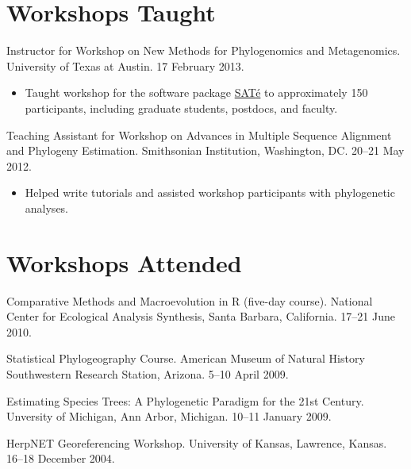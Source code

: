 \documentclass[10pt]{article}
\newcommand{\myHangIndent}{\hangindent=5mm}
\newcommand{\myIndent}{\hspace{5mm}}
\begin{document}
\section*{Workshops Taught}
\myHangIndent
Instructor for Workshop on New Methods for Phylogenomics and Metagenomics.
University of Texas at Austin.
17 February 2013. \\
\begin{itemize}
    \setlength{\leftskip}{0em}
    \setlength{\itemsep}{0.25em}
    \setlength{\parskip}{-1em}
    \setlength{\parsep}{0.5em}
\item Taught workshop for the software package
    \href{http://phylo.bio.ku.edu/software/sate/sate.html}{{SAT}\'{e}} to
approximately 150 participants, including graduate students, postdocs, and
faculty.
\end{itemize}

\myHangIndent
Teaching Assistant for Workshop on Advances in Multiple Sequence Alignment and
Phylogeny Estimation.
Smithsonian Institution, Washington, DC.
20--21 May 2012. \\
\begin{itemize}
    \setlength{\leftskip}{0em}
    \setlength{\itemsep}{0.25em}
    \setlength{\parskip}{-1em}
    \setlength{\parsep}{0.5em}
    \item Helped write tutorials and assisted workshop participants with
        phylogenetic analyses.
\end{itemize}

\section*{Workshops Attended}
\myHangIndent
Comparative Methods and Macroevolution in R (five-day course).
National Center for Ecological Analysis Synthesis, Santa Barbara, California.
17--21 June 2010.

\myHangIndent
Statistical Phylogeography Course.
American Museum of Natural History Southwestern Research Station, Arizona.
5--10 April 2009.

\myHangIndent
Estimating Species Trees: A Phylogenetic Paradigm for the 21st Century.
Unversity of Michigan, Ann Arbor, Michigan.
10--11 January 2009.

\myHangIndent
HerpNET Georeferencing Workshop.
University of Kansas, Lawrence, Kansas.
16--18 December 2004.
\end{document}
